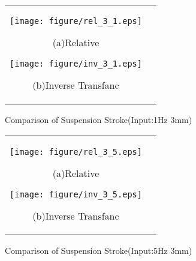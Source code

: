 \documentclass[a4paper,12pt]{article_vdlab_sotsuron}
\begin{document}
\vspace*{10mm}
\begin{figure}[h]
  \begin{tabular}{cc}
  \begin{minipage}{0.5\hsize}
  \begin{center}
    \texttt{[image: figure/rel\_3\_1.eps]}
    \end{center}
    \begin{center}
    \ (a)Relative\
    \end{center}
  \end{minipage}
  \begin{minipage}{0.5\hsize}
     \begin{center}
      \texttt{[image: figure/inv\_3\_1.eps]}
      \end{center}
      \begin{center}
      \ (b)Inverse Transfanc\
    \end{center}
  \end{minipage}
  \end{tabular}
  \vspace*{3mm}
  \caption{Comparison of Suspension Stroke(Input:1Hz 3mm)}
    \label{fig:compare_2_7}
\end{figure}
\begin{figure}[h]
  \begin{tabular}{cc}
  \begin{minipage}{0.5\hsize}
  \begin{center}
    \texttt{[image: figure/rel\_3\_5.eps]}
    \end{center}
    \begin{center}
    \ (a)Relative\
    \end{center}
  \end{minipage}
  \begin{minipage}{0.5\hsize}
     \begin{center}
      \texttt{[image: figure/inv\_3\_5.eps]}
      \end{center}
      \begin{center}
      \ (b)Inverse Transfanc\
    \end{center}
  \end{minipage}
  \end{tabular}
  \vspace*{3mm}
  \caption{Comparison of Suspension Stroke(Input:5Hz 3mm)}
    \label{fig:compare_3_5}
\end{figure}
\end{document}
